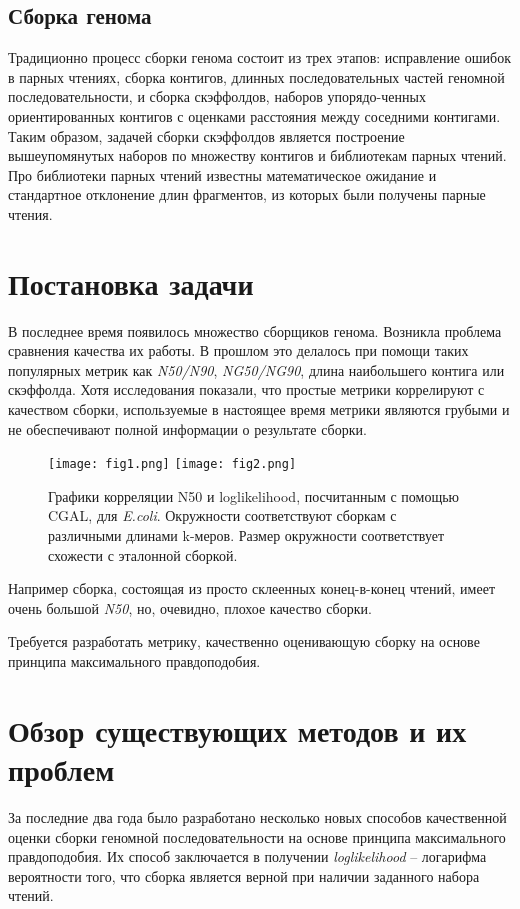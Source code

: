 \subsection{Сборка генома}

Традиционно процесс сборки генома состоит из трех этапов: исправление ошибок в парных чтениях, сборка контигов, длинных последовательных частей геномной последовательности, и сборка скэффолдов, наборов упорядо-ченных ориентированных контигов с оценками расстояния между соседними контигами. Таким образом, задачей сборки скэффолдов является построение вышеупомянутых наборов по множеству контигов и библиотекам парных чтений. Про библиотеки парных чтений известны математическое ожидание и стандартное отклонение длин фрагментов, из которых были получены парные чтения.


\section{Постановка задачи}

В последнее время появилось множество сборщиков генома. Возникла проблема сравнения качества их работы. В прошлом это делалось при помощи таких популярных метрик как \textit{N50/N90}, \textit{NG50/NG90}, длина наибольшего контига или скэффолда.  Хотя исследования показали, что простые метрики коррелируют с качеством сборки, используемые в настоящее время метрики являются грубыми и не обеспечивают полной информации о результате сборки.
\begin{figure}[t]
\texttt{[image: fig1.png]}
\texttt{[image: fig2.png]}
\caption{Графики корреляции N50 и loglikelihood, посчитанным с помощью CGAL, для \textit{E.coli}. Окружности соответствуют сборкам с различными длинами k-меров. Размер окружности соответствует схожести с эталонной сборкой.}
\label{fig:N50vsLoglik}
\end{figure}
Например сборка, состоящая из просто склеенных конец-в-конец чтений, имеет очень большой \textit{N50}, но, очевидно, плохое качество сборки.

Требуется разработать метрику, качественно оценивающую сборку на основе принципа максимального правдоподобия.


\section{Обзор существующих методов и их проблем}
За последние два года было разработано несколько новых способов качественной оценки сборки геномной последовательности на основе принципа максимального правдоподобия. Их способ заключается в получении \textit{loglikelihood} -- логарифма вероятности того, что сборка является верной при наличии заданного набора чтений.

